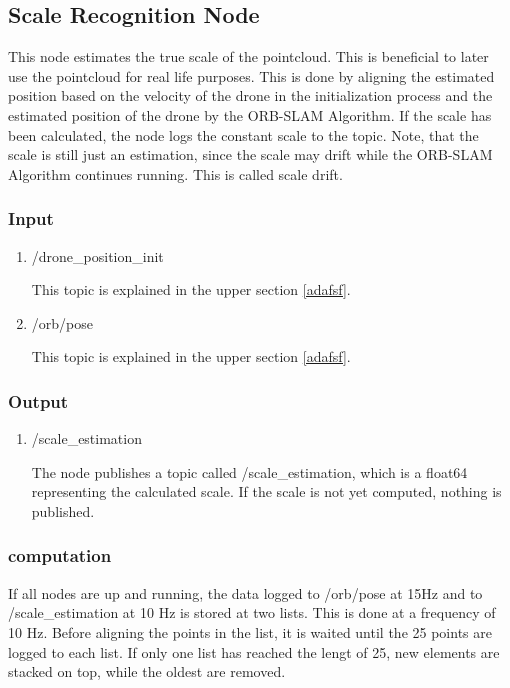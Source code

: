 	
	\subsection{Scale Recognition Node}
	
	This node estimates the true scale of the pointcloud. This is beneficial to later use the pointcloud for real life purposes. 
	This is done by aligning the estimated position based on the velocity of the drone in the initialization process and the 
	estimated position of the drone by the ORB-SLAM Algorithm. If the scale has been calculated, the node logs the constant scale 
	to the topic. Note, that the scale is still just an estimation, since the scale may drift while the ORB-SLAM Algorithm continues
	running. This is called scale drift.
	
	\subsubsection{Input}
	
	\begin{enumerate}
	\item{/drone\_position\_init}
	
	This topic is explained in the upper section \ref{adafsf}. 
	
	\item{/orb/pose}
	
	This topic is explained in the upper section \ref{adafsf}.
	
	\end{enumerate}
	
	\subsubsection{Output}
	
	\begin{enumerate}
	\item{/scale\_estimation}
	
	The node publishes a topic called /scale\_estimation, which is a float64 representing the calculated scale. If the scale is not yet computed, nothing is published. 
	
	\end{enumerate}
	
	\subsubsection{computation}
	
	If all nodes are up and running, the data logged to /orb/pose at 15Hz and to /scale\_estimation at 10 Hz is stored at two lists. This is done at 
	a frequency of 10 Hz. Before aligning the points in the list, it is waited until the 25 points are logged to each list. If only one list has reached 
	the lengt of 25, new elements are stacked on top, while the oldest are removed. 
	
